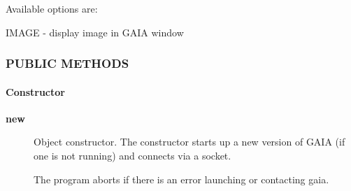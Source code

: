 Available options are:



IMAGE - display image in GAIA window

\subsubsection*{PUBLIC METHODS\label{ORAC::Display::GAIA_PUBLIC_METHODS}}
\paragraph*{Constructor\label{ORAC::Display::GAIA_Constructor}}
\begin{description}

\item[{\textbf{new}}] \mbox{}

Object constructor. The constructor starts up a new version of
GAIA (if one is not running) and connects via a socket.



The program aborts if there is an error launching or contacting
gaia.

\end{description}
